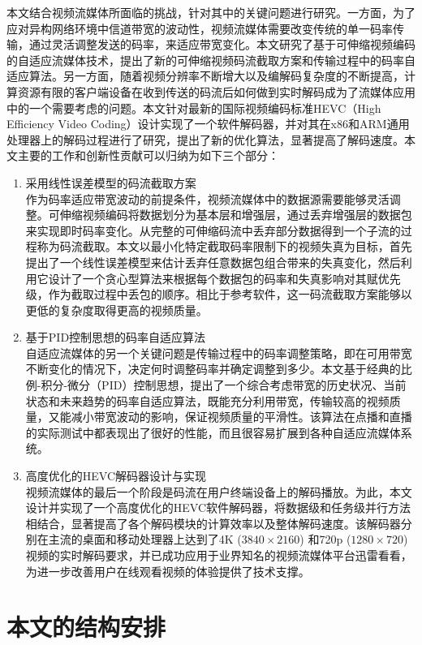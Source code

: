 本文结合视频流媒体所面临的挑战，针对其中的关键问题进行研究。一方面，为了应对异构网络环境中信道带宽的波动性，视频流媒体需要改变传统的单一码率传输，通过灵活调整发送的码率，来适应带宽变化。本文研究了基于可伸缩视频编码\supercite{SVC-Overview}的自适应流媒体技术，提出了新的可伸缩视频码流截取方案和传输过程中的码率自适应算法。另一方面，随着视频分辨率不断增大以及编解码复杂度的不断提高，计算资源有限的客户端设备在收到传送的码流后如何做到实时解码成为了流媒体应用中的一个需要考虑的问题。本文针对最新的国际视频编码标准HEVC（High Efficiency Video Coding）\supercite{HEVC-Overview}设计实现了一个软件解码器，并对其在x86和ARM通用处理器上的解码过程进行了研究，提出了新的优化算法，显著提高了解码速度。本文主要的工作和创新性贡献可以归纳为如下三个部分：
\begin{enumerate}
\item {采用线性误差模型的码流截取方案}\\
作为码率适应带宽波动的前提条件，视频流媒体中的数据源需要能够灵活调整。可伸缩视频编码将数据划分为基本层和增强层，通过丢弃增强层的数据包来实现即时码率变化。从完整的可伸缩码流中丢弃部分数据得到一个子流的过程称为码流截取。本文以最小化特定截取码率限制下的视频失真为目标，首先提出了一个线性误差模型来估计丢弃任意数据包组合带来的失真变化，然后利用它设计了一个贪心型算法来根据每个数据包的码率和失真影响对其赋优先级，作为截取过程中丢包的顺序。相比于参考软件，这一码流截取方案能够以更低的复杂度取得更高的视频质量。
\item {基于PID控制思想的码率自适应算法}\\
自适应流媒体的另一个关键问题是传输过程中的码率调整策略，即在可用带宽不断变化的情况下，决定何时调整码率并确定调整到多少。本文基于经典的比例-积分-微分（PID）控制思想，提出了一个综合考虑带宽的历史状况、当前状态和未来趋势的码率自适应算法，既能充分利用带宽，传输较高的视频质量，又能减小带宽波动的影响，保证视频质量的平滑性。该算法在点播和直播的实际测试中都表现出了很好的性能，而且很容易扩展到各种自适应流媒体系统。
\item {高度优化的HEVC解码器设计与实现}\\
视频流媒体的最后一个阶段是码流在用户终端设备上的解码播放。为此，本文设计并实现了一个高度优化的HEVC软件解码器，将数据级和任务级并行方法相结合，显著提高了各个解码模块的计算效率以及整体解码速度。该解码器分别在主流的桌面和移动处理器上达到了4K ($3840 \times 2160$) 和720p ($1280 \times 720$) 视频的实时解码要求，并已成功应用于业界知名的视频流媒体平台迅雷看看，为进一步改善用户在线观看视频的体验提供了技术支撑。
\end{enumerate}

\section{本文的结构安排}

